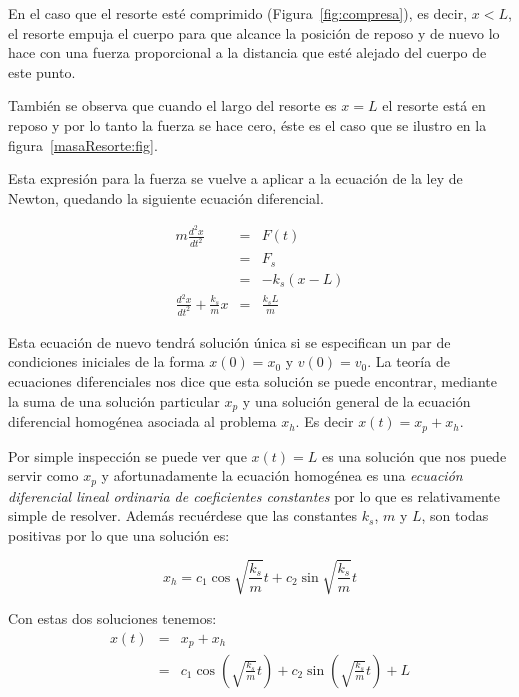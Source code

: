 En el caso que el resorte esté comprimido (Figura~\ref{fig:compresa}), es decir, $ x < L$, el resorte empuja el cuerpo para que alcance la posición de reposo y de nuevo lo hace con una fuerza proporcional a la distancia que esté alejado del cuerpo de este punto. 

También se observa que cuando el largo del resorte es $ x = L$ el resorte está en reposo y por lo tanto la fuerza se hace cero, éste es el caso que se ilustro en la figura~\ref{masaResorte:fig}.

Esta expresión para la fuerza se vuelve a aplicar a la ecuación de la ley de Newton, quedando la siguiente ecuación diferencial.

\begin{eqnarray}
m \frac{d^2x}{dt^2} & = & F(t) \nonumber \\
                    & = & F_s \nonumber \\
                    & = & -k_s \left( x - L \right) \nonumber \\
\frac{d^2x}{dt^2} + \frac{k_s}{m}x  & = & \frac{k_s L}{m}
\end{eqnarray}

Esta ecuación de nuevo tendrá solución única si se especifican un par de condiciones iniciales de la forma $x(0) = x_0$ y $ v(0) = v_0 $.
La teoría de ecuaciones diferenciales nos dice que esta solución se puede encontrar, mediante la suma de una solución particular $x_p$ y una solución general de la ecuación diferencial homogénea asociada al problema $x_h$.
Es decir $x(t) = x_p + x_h$.

Por simple inspección se puede ver que $x(t)= L$ es una solución que nos puede servir como $x_p$ y afortunadamente la ecuación homogénea  es una \emph{ecuación diferencial lineal ordinaria de coeficientes constantes} por lo que es relativamente simple de resolver.
Además recuérdese que las constantes $k_s$, $m$ y $L$, son todas positivas por lo que una solución es:

\begin{equation}
x_h = c_1 \cos{\sqrt{\frac{k_s}{m}}}t + c_2 \sin{\sqrt{\frac{k_s}{m}}}t
\end{equation}

Con estas dos soluciones tenemos:
\begin{eqnarray}
x(t) & = & x_p + x_h \nonumber \\
     & = & c_1 \cos{\left(\sqrt{\frac{k_s}{m}} t \right)} + c_2 \sin{\left(\sqrt{\frac{k_s}{m}} t \right)} + L
\end{eqnarray}

